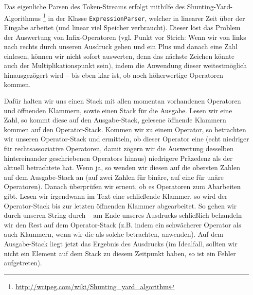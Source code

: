 Das eigenliche Parsen des Token-Streams erfolgt mithilfe des
Shunting-Yard-Algorithmus \footnote{\url{http://wcipeg.com/wiki/Shunting_yard_algorithm}} in
der Klasse \texttt{ExpressionParser}, welcher in linearer Zeit über der Eingabe
arbeitet (und linear viel Speicher verbraucht). Dieser löst das Problem der
Auswertung von Infix-Operatoren (vgl. Punkt vor Strich: Wenn wir von links nach
rechts durch unseren Ausdruck gehen und ein Plus und danach eine Zahl einlesen,
können wir nicht sofort auswerten, denn das nächste Zeichen könnte auch der
Multiplikationspunkt sein), indem die Anwendung dieser weitestmöglich
hinausgezögert wird -- bis eben klar ist, ob noch höherwertige Operatoren kommen.

Dafür halten wir uns einen Stack mit allen momentan vorhandenen Operatoren und
öffnenden Klammern, sowie einen Stack für die Ausgabe. Lesen wir eine Zahl, so
kommt diese auf den Ausgabe-Stack, gelesene öffnende Klammern kommen auf den
Operator-Stack. Kommen wir zu einem Operator, so betrachten wir unseren
Operator-Stack und ermitteln, ob dieser Operator eine (echt niedriger für
rechtsassoziative Operatoren, damit zögern wir die Auswertung desselben
hintereinander geschriebenen Operators hinaus) niedrigere Präzedenz als der
aktuell betrachtete hat. Wenn ja, so wenden wir diesen auf die obersten Zahlen
auf dem Ausgabe-Stack an (auf zwei Zahlen für binäre, auf eine für unäre
Operatoren). Danach überprüfen wir erneut, ob es Operatoren zum Abarbeiten gibt.
Lesen wir irgendwann im Text eine schließende Klammer, so wird der
Operator-Stack bis zur letzten öffnenden Klammer abgearbeitet. So gehen wir
durch unseren String durch – am Ende unseres Ausdrucks schließlich behandeln wir
den Rest auf dem Operator-Stack (z.B. indem ein schwächerer Operator als auch
Klammern, wenn wir die als solche betrachten, anwenden). Auf dem Ausgabe-Stack
liegt jetzt das Ergebnis des Ausdrucks (im Idealfall, sollten wir nicht ein
Element auf dem Stack zu diesem Zeitpunkt haben, so ist ein Fehler aufgetreten).

